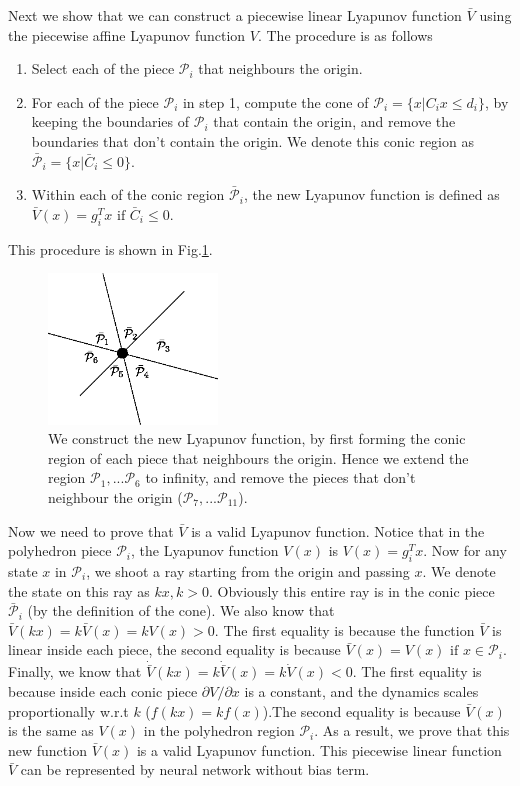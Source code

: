 \documentclass{article}
\begin{document}
Next we show that we can construct a piecewise linear Lyapunov function $\bar{V}$ using the piecewise affine Lyapunov function $V$. The procedure is as follows
\begin{enumerate}
	\item Select each of the piece $\mathcal{P}_i$ that neighbours the origin.
	\item For each of the piece $\mathcal{P}_i$ in step 1, compute the cone of $\mathcal{P}_i = \{x | C_ix\le d_i\}$, by keeping the boundaries of $\mathcal{P}_i$ that contain the origin, and remove the boundaries that don't contain the origin. We denote this conic region as $\bar{\mathcal{P}}_i=\{x|\bar{C}_i\le 0\}$.
	\item Within each of the conic region $\bar{\mathcal{P}}_i$, the new Lyapunov function is defined as $\bar{V}(x) = g_i^Tx \text{ if } \bar{C}_i \le 0$. 
\end{enumerate}
This procedure is shown in Fig.\ref{fig:global_convergence2}.
\begin{figure}
	\centering
	\includegraphics[width=0.4\textwidth]{./global_convergence2.eps}
	\caption{We construct the new Lyapunov function, by first forming the conic region of each piece that neighbours the origin. Hence we extend the region $\mathcal{P}_1, ...\mathcal{P}_6$ to infinity, and remove the pieces that don't neighbour the origin ($\mathcal{P}_7, ...\mathcal{P}_{11}$).}
	\label{fig:global_convergence2}
\end{figure}
Now we need to prove that $\bar{V}$ is a valid Lyapunov function. Notice that in the polyhedron piece $\mathcal{P}_i$, the Lyapunov function $V(x)$ is $V(x) = g_i^Tx$. Now for any state $x$ in $\mathcal{P}_i$, we shoot a ray starting from the origin and passing $x$. We denote the state on this ray as $kx, k > 0$. Obviously this entire ray is in the conic piece $\bar{\mathcal{P}}_i$ (by the definition of the cone). We also know that $\bar{V}(kx) = k\bar{V}(x) = kV(x)>0$. The first equality is because the function $\bar{V}$ is linear inside each piece, the second equality is because $\bar{V}(x) = V(x) \text{ if } x\in\mathcal{P}_i$. Finally, we know that $\dot{\bar{V}}(kx) = k\dot{\bar{V}}(x) = k\dot{V}(x) < 0$. The first equality is because inside each conic piece $\partial V/\partial x$ is a constant, and the dynamics scales proportionally w.r.t $k$ ($f(kx) = kf(x)$).The second equality is because $\bar{V}(x)$ is the same as $V(x)$ in the polyhedron region $\mathcal{P}_i$. As a result, we prove that this new function $\bar{V}(x)$ is a valid Lyapunov function. This piecewise linear function $\bar{V}$ can be represented by neural network without bias term.
\end{document}
